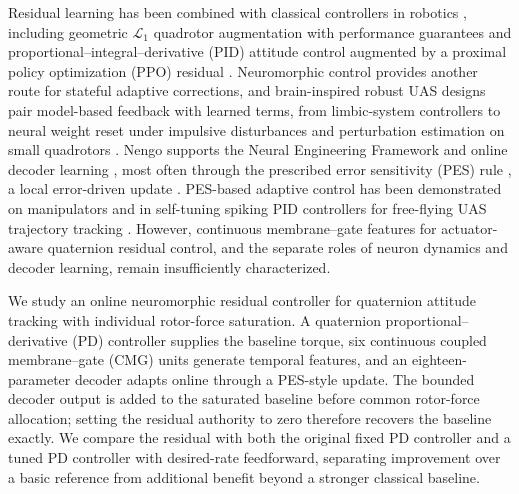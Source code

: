 \documentclass[letterpaper, 10 pt, conference]{ieeeconf}
\begin{document}

Residual learning has been combined with classical controllers in robotics
\cite{johannink2019}, including geometric $\mathcal L_1$ quadrotor
augmentation with performance guarantees \cite{wu2025l1quad} and
proportional--integral--derivative (PID) attitude control augmented by a
proximal policy optimization (PPO) residual \cite{li2027hpappo}. Neuromorphic
control provides another route for stateful adaptive corrections, and brain-inspired robust UAS
designs pair model-based feedback with learned terms, from limbic-system controllers
\cite{rubioscola2023limbic,escareno2024limbic} to neural weight reset under impulsive
disturbances \cite{rubioscola2023weightreset} and perturbation estimation on small quadrotors
\cite{rubioscola2021mambo}. Nengo supports the Neural Engineering Framework
\cite{eliasmith2004neuraleng} and online decoder learning \cite{bekolay2014nengo}, most often
through the prescribed error sensitivity (PES) rule \cite{macneil2011pes}, a local error-driven
update \cite{voelker2015pes}. PES-based adaptive control has been demonstrated on manipulators
\cite{dewolf2016arm,dewolf2020nengo} and in self-tuning spiking PID controllers for free-flying
UAS trajectory tracking \cite{olivares2025ifac,olivares2026selftuning}. However, continuous
membrane--gate features for actuator-aware quaternion residual control, and the
separate roles of neuron dynamics and decoder learning, remain insufficiently
characterized.

We study an online neuromorphic residual controller for quaternion attitude
tracking with individual rotor-force saturation. A quaternion
proportional--derivative (PD) controller supplies the baseline torque, six
continuous coupled membrane--gate (CMG) units generate temporal features, and
an eighteen-parameter decoder adapts online through a PES-style update. The
bounded decoder output is added to the saturated baseline before common
rotor-force allocation; setting the residual authority to zero therefore
recovers the baseline exactly. We compare the residual with both the original
fixed PD controller and a tuned PD controller with desired-rate feedforward,
separating improvement over a basic reference from additional benefit beyond a
stronger classical baseline.
\end{document}
